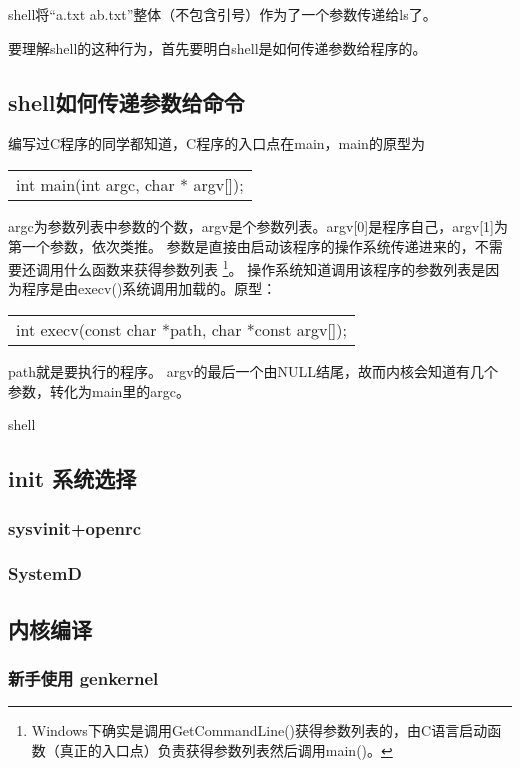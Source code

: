 \documentclass[amstex,twoside]{ctexbook}
\newenvironment{insertnote}{ \ttfamily\CJKfamily{KaiTi} }{\vskip 1cm }
\newenvironment{code}{\small\tt\begin{longtable}{p{0.8\textwidth}}}{\end{longtable}}
\begin{document}
shell将“a.txt ab.txt”整体（不包含引号）作为了一个参数传递给ls了。

要理解shell的这种行为，首先要明白shell是如何传递参数给程序的。

\begin{insertnote}
\subsection*{shell如何传递参数给命令}

编写过C程序的同学都知道，C程序的入口点在main，main的原型为

\begin{code}
int main(int argc, char * argv[]);
\end{code}

argc为参数列表中参数的个数，argv是个参数列表。argv[0]是程序自己，argv[1]为第一个参数，依次类推。
参数是直接由启动该程序的操作系统传递进来的，不需要还调用什么函数来获得参数列表
\footnote{Windows下确实是调用GetCommandLine()获得参数列表的，由C语言启动函数（真正的入口点）负责获得参数列表然后调用main()。}。
操作系统知道调用该程序的参数列表是因为程序是由execv()系统调用加载的。原型：
\begin{code}
int execv(const char *path, char *const argv[]);
\end{code}
path就是要执行的程序。
argv的最后一个由NULL结尾，故而内核会知道有几个参数，转化为main里的argc。

shell


\end{insertnote}

\subsection{init 系统选择}

\subsubsection{sysvinit+openrc}
\subsubsection{SystemD}

\subsection{内核编译}

\subsubsection{新手使用 genkernel}
\end{document}
